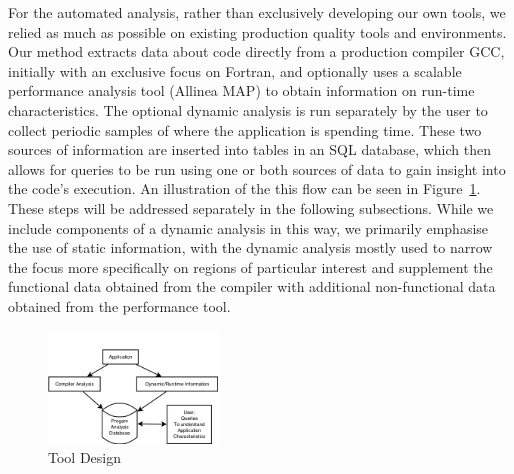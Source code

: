 For the automated analysis, rather than exclusively developing our own tools, we relied as much as possible on existing production quality tools and environments.
Our method extracts data about code directly from a production compiler \ac{GCC}, initially with an exclusive focus on Fortran, and optionally uses a scalable performance analysis tool (Allinea MAP) to obtain information on run-time characteristics.
The optional dynamic analysis is run separately by the user to collect periodic samples of where the application is spending time.
These two sources of information are inserted into tables in an \acs{SQL} database, which then allows for queries to be run using one or both sources of data to gain insight into the code's execution.
An illustration of the this flow can be seen in Figure~\ref{fig:design}.
These steps will be addressed separately in the following subsections.
While we include components of a dynamic analysis in this way, we primarily emphasise the use of static information, with the dynamic analysis mostly used to narrow the focus more specifically on regions of particular interest and supplement the functional data obtained from the compiler with additional non-functional data obtained from the performance tool.

\begin{figure}
\begin{center}
\includegraphics[width=0.4\textwidth]{images/design.png}
\end{center}
\caption{Tool Design}
\label{fig:design}
\end{figure}

